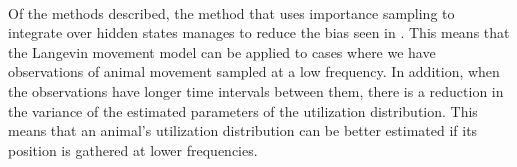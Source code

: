 \

Of the methods described, the method that uses importance sampling to integrate over hidden states manages to reduce the bias seen in \parencite{michelot_langevin_2019}. This means that the Langevin movement model can be applied to cases where we have observations of animal movement sampled at a low frequency. In addition, when the observations have longer time intervals between them, there is a reduction in the variance of the estimated parameters of the utilization distribution. This means that an animal's utilization distribution can be better estimated if its position is gathered at lower frequencies.










